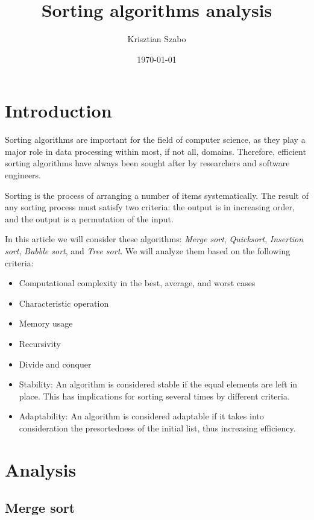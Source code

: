 \documentclass[12pt, a4paper]{article}
\title{Sorting algorithms analysis}
\author{Krisztian Szabo}
\date{\today{}}
\begin{document}
\maketitle
{}
\newpage

\tableofcontents
\newpage

\section{Introduction}
	
Sorting algorithms are important for the field of computer science, as they
play a major role in data processing within most, if not all, domains. Therefore, efficient sorting algorithms have always been sought after by researchers
and software engineers.

Sorting is the process of arranging a number of items systematically. The
result of any sorting process must satisfy two criteria: the output is in increasing order, and the output is a permutation of the input.

In this article we will consider these algorithms: \textit{Merge sort},
\textit{Quicksort}, \textit{Insertion sort}, \textit{Bubble sort}, and \textit{Tree sort}. We will analyze them based on the following criteria:
\begin{itemize}
\item Computational complexity in the best, average, and worst cases
\item Characteristic operation
\item Memory usage
\item Recursivity
\item Divide and conquer
\item Stability: An algorithm is considered stable if the equal elements are
left in place. This has implications for sorting several times by different
criteria.
\item Adaptability: An algorithm is considered adaptable if it takes into consideration the presortedness of the initial list, thus increasing efficiency.
\end{itemize}
\newpage

\section{Analysis}
\subsection{Merge sort}
\end{document}

